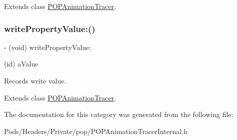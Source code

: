 Extends class \mbox{\hyperlink{interface_p_o_p_animation_tracer_aa703f72cf374b9f6feb44c0fe8d508d9}{P\+O\+P\+Animation\+Tracer}}.

\mbox{\label{category_p_o_p_animation_tracer_07_internal_08_aa703f72cf374b9f6feb44c0fe8d508d9}} 
\subsubsection{\texorpdfstring{write\+Property\+Value\+:()}{writePropertyValue:()}\hspace{0.1cm}{\footnotesize\ttfamily [2/2]}}
{\footnotesize\ttfamily -\/ (void) write\+Property\+Value\+: \begin{DoxyParamCaption}\item[{(id)}]{a\+Value }\end{DoxyParamCaption}}

Records write value. 

Extends class \mbox{\hyperlink{interface_p_o_p_animation_tracer_aa703f72cf374b9f6feb44c0fe8d508d9}{P\+O\+P\+Animation\+Tracer}}.



The documentation for this category was generated from the following file\+:\begin{DoxyCompactItemize}
\item 
Pods/\+Headers/\+Private/pop/P\+O\+P\+Animation\+Tracer\+Internal.\+h\end{DoxyCompactItemize}
